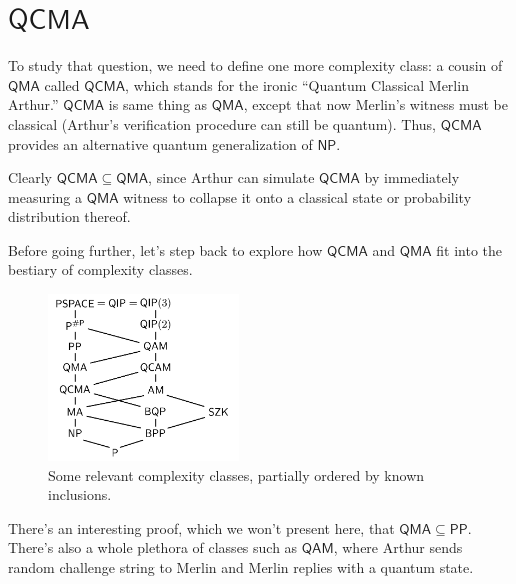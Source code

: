 \documentclass[12pt]{report}
\theoremstyle{plain}
\theoremstyle{definition}
\begin{document}
\section{$\mathsf{QCMA}$}

To study that question, we need to define one more complexity class: a cousin of $\mathsf{QMA}$ called $\mathsf{QCMA}$, which stands for the ironic ``Quantum Classical Merlin Arthur.'' $\mathsf{QCMA}$ is same thing as $\mathsf{QMA}$, except that now Merlin's witness must be classical (Arthur's verification procedure can still be quantum).  Thus, $\mathsf{QCMA}$ provides an alternative quantum generalization of $\mathsf{NP}$.

Clearly $\mathsf{QCMA} \subseteq \mathsf{QMA}$, since Arthur can simulate $\mathsf{QCMA}$ by immediately measuring a $\mathsf{QMA}$ witness to collapse it onto a classical state or probability distribution thereof.

Before going further, let's step back to explore how $\mathsf{QCMA}$ and $\mathsf{QMA}$ fit into the bestiary of complexity classes.

\begin{figure}[h!]\label{fig:ComplexityClassHierarchy}
  \begin{center}
\includegraphics[width=0.45\textwidth]{ComplexityClassLattice.png}
\caption{Some relevant complexity classes, partially ordered by known inclusions.}
  \end{center}
\end{figure}

There's an interesting proof, which we won't present here, that $\mathsf{QMA} \subseteq \mathsf{PP}$.  There's also a whole plethora of classes such as $\mathsf{QAM}$, where Arthur sends random challenge string to Merlin and Merlin replies with a quantum state.
\end{document}
